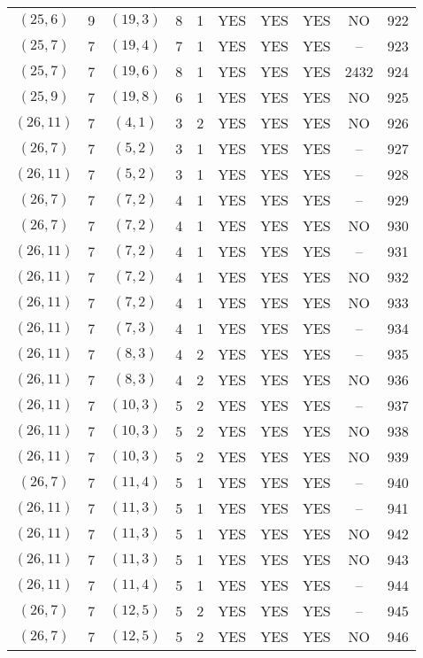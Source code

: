 \begin{longtable}{|c|c|c|c|c|c|c|c|c|c|}
$(25, 6)$ & 9 & $(19, 3)$ & 8 & 1 & YES & YES & YES & NO & 922\\
$(25, 7)$ & 7 & $(19, 4)$ & 7 & 1 & YES & YES & YES & -- & 923\\
$(25, 7)$ & 7 & $(19, 6)$ & 8 & 1 & YES & YES & YES & 2432 & 924\\
$(25, 9)$ & 7 & $(19, 8)$ & 6 & 1 & YES & YES & YES & NO & 925\\
$(26, 11)$ & 7 & $(4, 1)$ & 3 & 2 & YES & YES & YES & NO & 926\\
$(26, 7)$ & 7 & $(5, 2)$ & 3 & 1 & YES & YES & YES & -- & 927\\
$(26, 11)$ & 7 & $(5, 2)$ & 3 & 1 & YES & YES & YES & -- & 928\\
$(26, 7)$ & 7 & $(7, 2)$ & 4 & 1 & YES & YES & YES & -- & 929\\
$(26, 7)$ & 7 & $(7, 2)$ & 4 & 1 & YES & YES & YES & NO & 930\\
$(26, 11)$ & 7 & $(7, 2)$ & 4 & 1 & YES & YES & YES & -- & 931\\
$(26, 11)$ & 7 & $(7, 2)$ & 4 & 1 & YES & YES & YES & NO & 932\\
$(26, 11)$ & 7 & $(7, 2)$ & 4 & 1 & YES & YES & YES & NO & 933\\
$(26, 11)$ & 7 & $(7, 3)$ & 4 & 1 & YES & YES & YES & -- & 934\\
$(26, 11)$ & 7 & $(8, 3)$ & 4 & 2 & YES & YES & YES & -- & 935\\
$(26, 11)$ & 7 & $(8, 3)$ & 4 & 2 & YES & YES & YES & NO & 936\\
$(26, 11)$ & 7 & $(10, 3)$ & 5 & 2 & YES & YES & YES & -- & 937\\
$(26, 11)$ & 7 & $(10, 3)$ & 5 & 2 & YES & YES & YES & NO & 938\\
$(26, 11)$ & 7 & $(10, 3)$ & 5 & 2 & YES & YES & YES & NO & 939\\
$(26, 7)$ & 7 & $(11, 4)$ & 5 & 1 & YES & YES & YES & -- & 940\\
$(26, 11)$ & 7 & $(11, 3)$ & 5 & 1 & YES & YES & YES & -- & 941\\
$(26, 11)$ & 7 & $(11, 3)$ & 5 & 1 & YES & YES & YES & NO & 942\\
$(26, 11)$ & 7 & $(11, 3)$ & 5 & 1 & YES & YES & YES & NO & 943\\
$(26, 11)$ & 7 & $(11, 4)$ & 5 & 1 & YES & YES & YES & -- & 944\\
$(26, 7)$ & 7 & $(12, 5)$ & 5 & 2 & YES & YES & YES & -- & 945\\
$(26, 7)$ & 7 & $(12, 5)$ & 5 & 2 & YES & YES & YES & NO & 946\\

\end{longtable}
